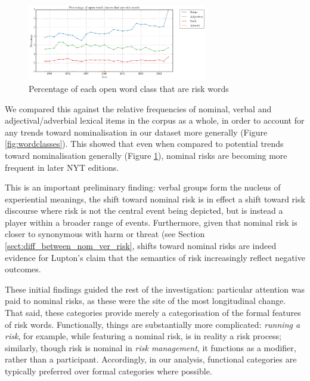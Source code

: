 \begin{figure}[htb!]
\centering
\includegraphics[width=0.7\textwidth]{../images/perc_open}
\caption{Percentage of each open word class that are risk words}
\label{fig:eachperc}
\end{figure}




\noindent We compared this against the relative frequencies of nominal, verbal and adjectival\slash adverbial lexical items in the corpus as a whole, in order to account for any trends toward nominalisation in our dataset more generally (Figure \ref{fig:wordclasses}). This showed that even when compared to potential trends toward nominalisation generally (Figure \ref{fig:eachperc}), nominal risks are becoming more frequent in later NYT editions. 

This is an important preliminary finding: verbal groups form the nucleus of experiential meanings, the shift toward nominal risk is in effect a shift toward risk discourse where risk is not the central event being depicted, but is instead a player within a broader range of events. Furthermore, given that nominal risk is closer to synonymous with harm or threat (see Section \ref{sect:diff_between_nom_ver_risk}, shifts toward nominal risks are indeed evidence for Lupton's claim that the semantics of risk increasingly reflect negative outcomes.


These initial findings guided the rest of the investigation: particular attention was paid to nominal risks, as these were the site of the most longitudinal change. That said, these categories provide merely a categorisation of the formal features of risk words. Functionally, things are substantially more complicated: \emph{running a risk}, for example, while featuring a nominal risk, is in reality a risk process; similarly, though risk is nominal in \emph{risk management}, it functions as a modifier, rather than a participant. Accordingly, in our analysis, functional categories are typically preferred over formal categories where possible.

